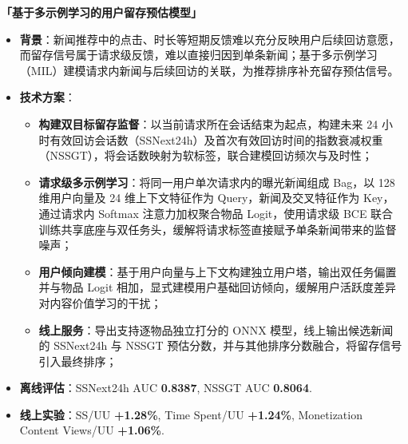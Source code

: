 \documentclass{resume}
\newcommand{\projectheading}[2]{%
  \par\addvspace{0.6em}%
  \noindent\textbf{\ifthenelse{\isempty{#1}}{项目}{#1}「#2」}\par\nopagebreak\vspace{0.2em}%
}
\newenvironment{projectbody}{%
  \begin{itemize}[label={}, leftmargin=0pt, labelsep=0pt,
    topsep=0pt, partopsep=0pt, parsep=0pt, itemsep=0pt]%
}{%
  \end{itemize}%
}
\begin{document}
\projectheading{项目二}{基于多示例学习的用户留存预估模型}
\begin{projectbody}

\item \textbf{背景}：新闻推荐中的点击、时长等短期反馈难以充分反映用户后续回访意愿，而留存信号属于请求级反馈，难以直接归因到单条新闻；基于多示例学习（MIL）建模请求内新闻与后续回访的关联，为推荐排序补充留存预估信号。

\item \textbf{技术方案}：
\begin{itemize}[label=\textbullet, labelsep=0.5em]
  \item \textbf{构建双目标留存监督}：以当前请求所在会话结束为起点，构建未来 24 小时有效回访会话数（SSNext24h）及首次有效回访时间的指数衰减权重（NSSGT），将会话数映射为软标签，联合建模回访频次与及时性；

  \item \textbf{请求级多示例学习}：将同一用户单次请求内的曝光新闻组成 Bag，以 128 维用户向量及 24 维上下文特征作为 Query，新闻及交叉特征作为 Key，通过请求内 Softmax 注意力加权聚合物品 Logit，使用请求级 BCE 联合训练共享底座与双任务头，缓解将请求标签直接赋予单条新闻带来的监督噪声；

  \item \textbf{用户倾向建模}：基于用户向量与上下文构建独立用户塔，输出双任务偏置并与物品 Logit 相加，显式建模用户基础回访倾向，缓解用户活跃度差异对内容价值学习的干扰；

  \item \textbf{线上服务}：导出支持逐物品独立打分的 ONNX 模型，线上输出候选新闻的 SSNext24h 与 NSSGT 预估分数，并与其他排序分数融合，将留存信号引入最终排序；

\end{itemize}

\item \textbf{离线评估}：SSNext24h AUC \textbf{0.8387}, NSSGT AUC \textbf{0.8064}.

\item \textbf{线上实验}：SS/UU \textbf{+1.28\%}, Time Spent/UU \textbf{+1.24\%}, Monetization Content Views/UU \textbf{+1.06\%}.
\end{projectbody}

\vspace{-0.5em}
\end{document}
